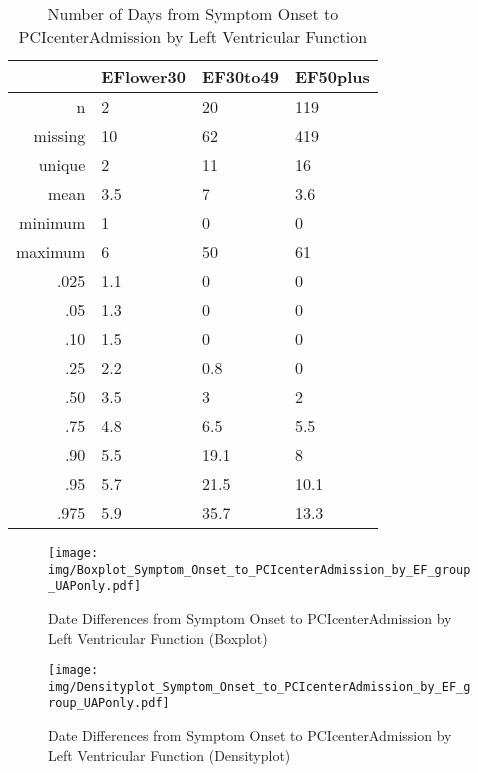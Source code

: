 \documentclass[a4paper]{report}
\begin{document}
\begin{itemize}
{%
\begin{table}[ht]
\centering
\begin{tabular}{rlll}
  \toprule
 & EFlower30 & EF30to49 & EF50plus \\ 
  \midrule
n & 2 & 20 & 119 \\ 
  missing & 10 & 62 & 419 \\ 
  unique & 2 & 11 & 16 \\ 
  mean & 3.5 & 7 & 3.6 \\ 
  minimum & 1 & 0 & 0 \\ 
  maximum & 6 & 50 & 61 \\ 
  .025 & 1.1 & 0 & 0 \\ 
  .05 & 1.3 & 0 & 0 \\ 
  .10 & 1.5 & 0 & 0 \\ 
  .25 & 2.2 & 0.8 & 0 \\ 
  .50 & 3.5 & 3 & 2 \\ 
  .75 & 4.8 & 6.5 & 5.5 \\ 
  .90 & 5.5 & 19.1 & 8 \\ 
  .95 & 5.7 & 21.5 & 10.1 \\ 
  .975 & 5.9 & 35.7 & 13.3 \\ 
   \bottomrule
\end{tabular}
\caption{Number of Days from Symptom Onset to PCIcenterAdmission by Left Ventricular Function} 
\end{table}
\begin{figure}
  \centering
  \caption{Date Differences from Symptom Onset to PCIcenterAdmission by Left Ventricular Function (Boxplot)}
  \label{Boxplot: Date Differences from Symptom Onset to PCIcenterAdmission by Left Ventricular Function}
\texttt{[image: img/Boxplot\_Symptom\_Onset\_to\_PCIcenterAdmission\_by\_EF\_group\_UAPonly.pdf]}\end{figure}


\begin{figure}
  \centering
  \caption{Date Differences from Symptom Onset to PCIcenterAdmission by Left Ventricular Function (Densityplot)}
  \label{Density: Date Differences from Symptom Onset to PCIcenterAdmission by Left Ventricular Function}
\texttt{[image: img/Densityplot\_Symptom\_Onset\_to\_PCIcenterAdmission\_by\_EF\_group\_UAPonly.pdf]}\end{figure}


\clearpage

}
\end{itemize}
\end{document}
